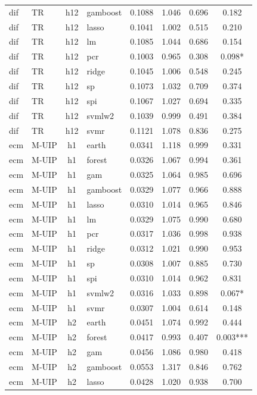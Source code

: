 \begin{ThreePartTable}
\begin{longtable}[t]{llclcccc}
dif & TR & h12 & gamboost & 0.1088 & 1.046 & 0.696 & 0.182\\
dif & TR & h12 & lasso & 0.1041 & 1.002 & 0.515 & 0.210\\
dif & TR & h12 & lm & 0.1085 & 1.044 & 0.686 & 0.154\\
dif & TR & h12 & pcr & 0.1003 & 0.965 & 0.308 & 0.098*\\
dif & TR & h12 & ridge & 0.1045 & 1.006 & 0.548 & 0.245\\
dif & TR & h12 & sp & 0.1073 & 1.032 & 0.709 & 0.374\\
dif & TR & h12 & spi & 0.1067 & 1.027 & 0.694 & 0.335\\
dif & TR & h12 & svmlw2 & 0.1039 & 0.999 & 0.491 & 0.384\\
dif & TR & h12 & svmr & 0.1121 & 1.078 & 0.836 & 0.275\\
\addlinespace
ecm & M-UIP & h1 & earth & 0.0341 & 1.118 & 0.999 & 0.331\\
ecm & M-UIP & h1 & forest & 0.0326 & 1.067 & 0.994 & 0.361\\
ecm & M-UIP & h1 & gam & 0.0325 & 1.064 & 0.985 & 0.696\\
ecm & M-UIP & h1 & gamboost & 0.0329 & 1.077 & 0.966 & 0.888\\
ecm & M-UIP & h1 & lasso & 0.0310 & 1.014 & 0.965 & 0.846\\
ecm & M-UIP & h1 & lm & 0.0329 & 1.075 & 0.990 & 0.680\\
ecm & M-UIP & h1 & pcr & 0.0317 & 1.036 & 0.998 & 0.938\\
ecm & M-UIP & h1 & ridge & 0.0312 & 1.021 & 0.990 & 0.953\\
ecm & M-UIP & h1 & sp & 0.0308 & 1.007 & 0.885 & 0.730\\
ecm & M-UIP & h1 & spi & 0.0310 & 1.014 & 0.962 & 0.831\\
ecm & M-UIP & h1 & svmlw2 & 0.0316 & 1.033 & 0.898 & 0.067*\\
ecm & M-UIP & h1 & svmr & 0.0307 & 1.004 & 0.614 & 0.148\\
\addlinespace
ecm & M-UIP & h2 & earth & 0.0451 & 1.074 & 0.992 & 0.444\\
ecm & M-UIP & h2 & forest & 0.0417 & 0.993 & 0.407 & 0.003***\\
ecm & M-UIP & h2 & gam & 0.0456 & 1.086 & 0.980 & 0.418\\
ecm & M-UIP & h2 & gamboost & 0.0553 & 1.317 & 0.846 & 0.762\\
ecm & M-UIP & h2 & lasso & 0.0428 & 1.020 & 0.938 & 0.700\\

\end{longtable}
\end{ThreePartTable}
